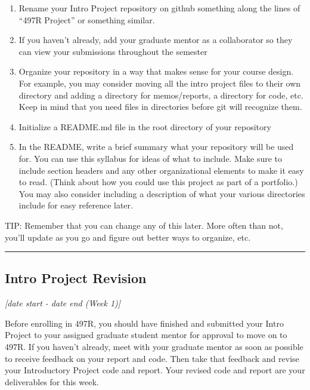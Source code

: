 \documentclass[12pt]{article}
\begin{document}
\begin{enumerate}
	\item Rename your Intro Project repository on github something along the lines of ``497R Project'' or something similar.
	\item If you haven't already, add your graduate mentor as a collaborator so they can view your submissions throughout the semester
	\item Organize your repository in a way that makes sense for your course design. For example, you may consider moving all the intro project files to their own directory and adding a directory for memos/reports, a directory for code, etc.  Keep in mind that you need files in directories before git will recognize them.
	\item Initialize a README.md file in the root directory of your repository
	\item In the README, write a brief summary what your repository will be used for.  You can use this syllabus for ideas of what to include.  Make sure to include section headers and any other organizational elements to make it easy to read. (Think about how you could use this project as part of a portfolio.) You may also consider including a description of what your various directories include for easy reference later.
\end{enumerate}

\noindent TIP:  Remember that you can change any of this later.
More often than not, you'll update as you go and figure out better ways to organize, etc.



\vspace{1em}\hrule\vspace{1em}
\subsection{Intro Project Revision}
\label{ssec:ipr}

\textit{[date start - date end (Week 1)]}

\bigskip

Before enrolling in 497R, you should have finished and submitted your Intro Project to your assigned graduate student mentor for approval to move on to 497R.
If you haven't already, meet with your graduate mentor as soon as possible to receive feedback on your report and code.  Then take that feedback and revise your Introductory Project code and report.  Your revised code and report are your deliverables for this week.
\end{document}
